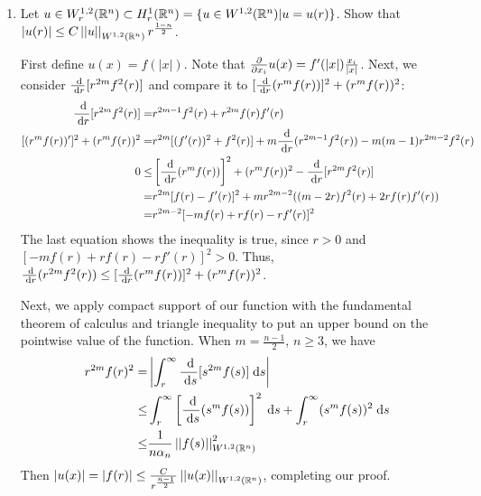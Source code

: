 \begin{enumerate}
\item Let $u \in W_r^{1, 2}(\mathbb{R}^n) \subset H_r^1(\mathbb{R}^n) = \{ u \in W^{1, 2}(\mathbb{R}^n) | u = u(r) \}$.
  Show that $|u(r)| \leq C \left|\left|u\right|\right|_{W^{1, 2}(\mathbb{R}^n)} r^{\frac{1 - n}{2}}$.

  First define $u(x) = f(|x|)$.
  Note that $\frac{\partial }{\partial x_i} u(x) = f'(|x|) \frac{x_i}{|x|}$.
  Next, we consider $\frac{\;\mathrm{d}}{\;\mathrm{d}r} [r^{2 m} f^2(r)]$
  and compare it to $[\frac{\;\mathrm{d}}{\;\mathrm{d}r} (r^m f(r))]^2 + (r^m f(r))^2$:
  \begin{align*}
    \frac{\;\mathrm{d}}{\;\mathrm{d}r} [r^{2 m} f^2(r)] = &r^{2 m - 1} f^2(r) + r^{2 m} f(r) f'(r)\\
    [(r^m f(r))']^2 + (r^m f(r))^2 = &r^{2 m} [(f'(r))^2 + f^2(r)] + m \frac{\;\mathrm{d}}{\;\mathrm{d}r} (r^{2 m - 1} f^2(r))
                                     - m (m - 1) r^{2 m - 2} f^2(r)\\
    0 \leq &\left[ \frac{\;\mathrm{d}}{\;\mathrm{d}r}(r^m f(r)) \right]^2 + (r^m f(r))^2 - \frac{\;\mathrm{d}}{\;\mathrm{d}r} [r^{2 m} f^2(r)]\\
           = &r^{2 m} [f(r) - f'(r)]^2 + m r^{2 m - 2} ((m - 2 r) f^2(r) + 2 r f(r) f'(r))\\
           = &r^{2 m - 2} [-m f(r) + r f(r) - r f'(r)]^2
  \end{align*}
  The last equation shows the inequality is true, since $r > 0$ and $[-m f(r) + r f(r) - r f'(r)]^2 > 0$.
  Thus, $\frac{\;\mathrm{d}}{\;\mathrm{d}r} (r^{2 m} f^2(r)) \leq [\frac{\;\mathrm{d}}{\;\mathrm{d}r}(r^m f(r))]^2 + (r^m f(r))^2$.

  Next, we apply compact support of our function with the fundamental theorem of calculus and
  triangle inequality to put an upper bound on the pointwise value of the function.
  When $m = \frac{n - 1}{2}$, $n \geq 3$, we have
  \begin{align*}
    r^{2 m} f(r)^2 = &\left|\int_{r}^{\infty} \frac{\;\mathrm{d}}{\;\mathrm{d}s} [s^{2 m} f(s)] \;\mathrm{d}s \right|\\
               \leq &\int_{r}^{\infty} \left[ \frac{\;\mathrm{d}}{\;\mathrm{d}s}(s^m f(s)) \right]^2 \;\mathrm{d}s
                     + \int_{r}^{\infty} (s^m f(s))^2 \;\mathrm{d}s\\
               \leq &\frac{1}{n \alpha_n} \left|\left|f(s)\right|\right|_{W^{1, 2}(\mathbb{R}^n)}^2
  \end{align*}
  Then $|u(x)| = |f(r)| \leq \frac{C}{r^{\frac{n - 1}{2}}} \left|\left|u(x)\right|\right|_{W^{1, 2}(\mathbb{R}^n)}$,
  completing our proof.


\end{enumerate}
